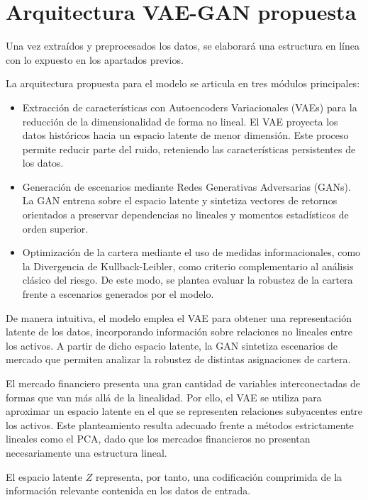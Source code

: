 \section{Arquitectura VAE-GAN propuesta}

Una vez extraídos y preprocesados los datos, se elaborará una estructura en línea con lo expuesto en los apartados previos.

La arquitectura propuesta para el modelo se articula en tres módulos principales:

\begin{itemize}
\item Extracción de características con Autoencoders Variacionales (VAEs) para la reducción de la dimensionalidad de forma no lineal. El VAE proyecta los datos históricos hacia un espacio latente de menor dimensión. Este proceso permite reducir parte del ruido, reteniendo las características persistentes de los datos.

\item Generación de escenarios mediante Redes Generativas Adversarias (GANs). La GAN entrena sobre el espacio latente y sintetiza vectores de retornos orientados a preservar dependencias no lineales y momentos estadísticos de orden superior.

\item Optimización de la cartera mediante el uso de medidas informacionales, como la Divergencia de Kullback-Leibler, como criterio complementario al análisis clásico del riesgo. De este modo, se plantea evaluar la robustez de la cartera frente a escenarios generados por el modelo.
\end{itemize}

De manera intuitiva, el modelo emplea el VAE para obtener una representación latente de los datos, incorporando información sobre relaciones no lineales entre los activos. A partir de dicho espacio latente, la GAN sintetiza escenarios de mercado que permiten analizar la robustez de distintas asignaciones de cartera.

El mercado financiero presenta una gran cantidad de variables interconectadas de formas que van más allá de la linealidad. Por ello, el VAE se utiliza para aproximar un espacio latente en el que se representen relaciones subyacentes entre los activos. Este planteamiento resulta adecuado frente a métodos estrictamente lineales como el PCA, dado que los mercados financieros no presentan necesariamente una estructura lineal.

El espacio latente $Z$ representa, por tanto, una codificación comprimida de la información relevante contenida en los datos de entrada.


